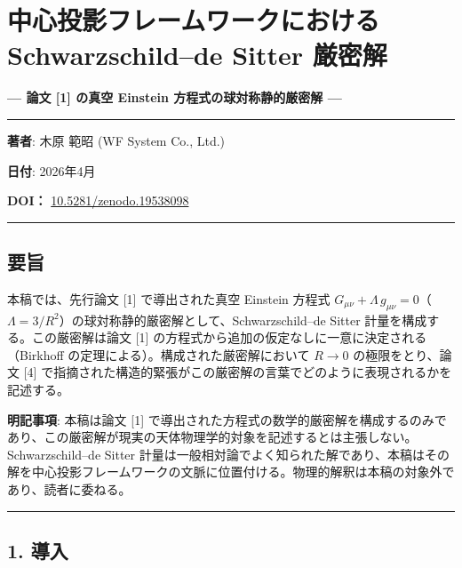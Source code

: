 \documentclass[a4paper,11pt]{ltjsarticle}
\theoremstyle{definition}
\begin{document}
\section{中心投影フレームワークにおける Schwarzschild--de Sitter
厳密解}\label{ux4e2dux5fc3ux6295ux5f71ux30d5ux30ecux30fcux30e0ux30efux30fcux30afux306bux304aux3051ux308b-schwarzschildde-sitter-ux53b3ux5bc6ux89e3}

\textbf{--- 論文 {[}1{]} の真空 Einstein 方程式の球対称静的厳密解 ---}

\begin{center}\rule{0.5\linewidth}{0.5pt}\end{center}

\textbf{著者}: 木原 範昭 (WF System Co., Ltd.)

\textbf{日付}: 2026年4月

\textbf{DOI：}
\href{https://doi.org/10.5281/zenodo.19538098}{10.5281/zenodo.19538098}

\begin{center}\rule{0.5\linewidth}{0.5pt}\end{center}

\subsection{要旨}\label{ux8981ux65e8}

本稿では、先行論文 {[}1{]} で導出された真空 Einstein 方程式
\(G_{\mu\nu} + \Lambda\, g_{\mu\nu} = 0\)（\(\Lambda = 3/R^2\)）の球対称静的厳密解として、Schwarzschild--de
Sitter 計量を構成する。この厳密解は論文 {[}1{]}
の方程式から追加の仮定なしに一意に決定される（Birkhoff
の定理による）。構成された厳密解において \(R \to 0\) の極限をとり、論文
{[}4{]}
で指摘された構造的緊張がこの厳密解の言葉でどのように表現されるかを記述する。

\textbf{明記事項}: 本稿は論文 {[}1{]}
で導出された方程式の数学的厳密解を構成するのみであり、この厳密解が現実の天体物理学的対象を記述するとは主張しない。Schwarzschild--de
Sitter
計量は一般相対論でよく知られた解であり、本稿はその解を中心投影フレームワークの文脈に位置付ける。物理的解釈は本稿の対象外であり、読者に委ねる。

\begin{center}\rule{0.5\linewidth}{0.5pt}\end{center}

\subsection{1. 導入}\label{ux5c0eux5165}
\end{document}
